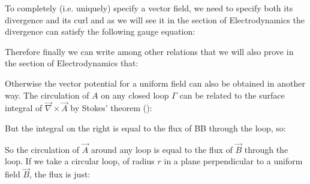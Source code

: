 	To completely (i.e. uniquely) specify a vector field, we need to specify both its divergence and its curl and as we will see it in the section of Electrodynamics the divergence can satisfy the following gauge equation:
	
	Therefore finally we can write among other relations that we will also prove in the section of Electrodynamics that:
	
	Otherwise the vector potential for a uniform field can also be obtained in another way. The circulation of $A$ on any closed loop $\Gamma$ can be related to the surface integral of $\vec{\nabla}\times\vec{A}$ by Stokes' theorem ():
	
	But the integral on the right is equal to the flux of BB through the loop, so:
	
	So the circulation of $\vec{A}$ around any loop is equal to the flux of $\vec{B}$ through the loop. If we take a circular loop, of radius $r$ in a plane perpendicular to a uniform field $\vec{B}$, the flux is just:
	
	
